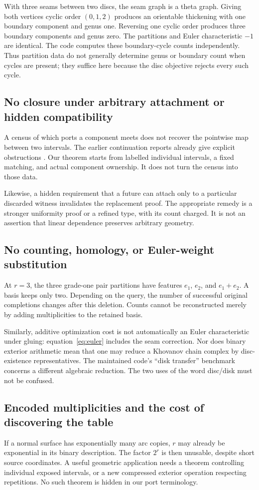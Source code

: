 \documentclass[11pt,a4paper]{article}
\theoremstyle{remark}\newtheorem{remark}[theorem]{Remark}
\begin{document}
With three seams between two discs, the seam graph is a theta graph. Giving both vertices cyclic order $(0,1,2)$ produces an orientable thickening with one boundary component and genus one. Reversing one cyclic order produces three boundary components and genus zero. The partitions and Euler characteristic $-1$ are identical. The code computes these boundary-cycle counts independently. Thus partition data do not generally determine genus or boundary count when cycles are present; they suffice here because the disc objective rejects every such cycle.

\subsection{No closure under arbitrary attachment or hidden compatibility}
A census of which ports a component meets does not recover the pointwise map between two intervals. The earlier continuation reports already give explicit obstructions \cite{ports,compiled}. Our theorem starts from labelled individual intervals, a fixed matching, and actual component ownership. It does not turn the census into those data.

Likewise, a hidden requirement that a future can attach only to a particular discarded witness invalidates the replacement proof. The appropriate remedy is a stronger uniformity proof or a refined type, with its count charged. It is not an assertion that linear dependence preserves arbitrary geometry.

\subsection{No counting, homology, or Euler-weight substitution}
At $r=3$, the three grade-one pair partitions have features $e_1$, $e_2$, and $e_1+e_2$. A basis keeps only two. Depending on the query, the number of successful original completions changes after this deletion. Counts cannot be reconstructed merely by adding multiplicities to the retained basis.

Similarly, additive optimization cost is not automatically an Euler characteristic under gluing: equation~\eqref{eq:euler} includes the seam correction. Nor does binary exterior arithmetic mean that one may reduce a Khovanov chain complex by disc-existence representatives. The maintained code's ``disk transfer'' benchmark concerns a different algebraic reduction. The two uses of the word disc/disk must not be confused.

\subsection{Encoded multiplicities and the cost of discovering the table}
If a normal surface has exponentially many arc copies, $r$ may already be exponential in its binary description. The factor $2^r$ is then unusable, despite short source coordinates. A useful geometric application needs a theorem controlling individual exposed intervals, or a new compressed exterior operation respecting repetitions. No such theorem is hidden in our port terminology.
\end{document}
